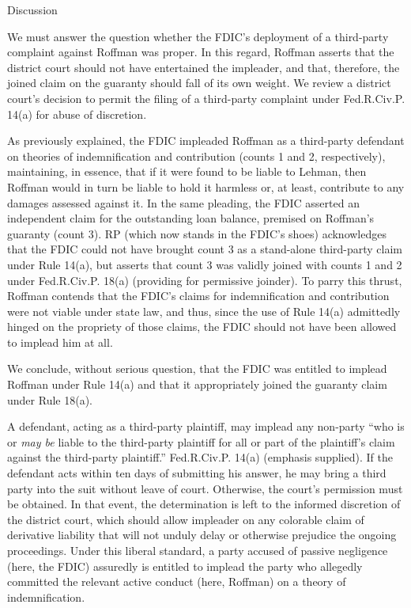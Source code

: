 \documentclass[11pt,letterpaper,twoside]{article}
\begin{document}
{Discussion}

We must answer the question whether the FDIC's deployment of a
third-party complaint against Roffman was proper. In this regard,
Roffman asserts that the district court should not have entertained the
impleader, and that, therefore, the joined claim on the guaranty should
fall of its own weight. We review a district court's decision to permit
the filing of a third-party complaint under Fed.R.Civ.P. 14(a) for abuse
of discretion.

As previously explained, the FDIC impleaded Roffman as a third-party
defendant on theories of indemnification and contribution (counts 1 and
2, respectively), maintaining, in essence, that if it were found to be
liable to Lehman, then Roffman would in turn be liable to hold it
harmless or, at least, contribute to any damages assessed against it. In
the same pleading, the FDIC asserted an independent claim for the
outstanding loan balance, premised on Roffman's guaranty (count 3). RP
(which now stands in the FDIC's shoes) acknowledges that the FDIC could
not have brought count 3 as a stand-alone third-party claim under Rule
14(a), but asserts that count 3 was validly joined with counts 1 and 2
under Fed.R.Civ.P. 18(a) (providing for permissive joinder). To parry
this thrust, Roffman contends that the FDIC's claims for indemnification
and contribution were not viable under state law, and thus, since the
use of Rule 14(a) admittedly hinged on the propriety of those claims,
the FDIC should not have been allowed to implead him at all.

We conclude, without serious question, that the FDIC was entitled to
implead Roffman under Rule 14(a) and that it appropriately joined the
guaranty claim under Rule 18(a).

A defendant, acting as a third-party plaintiff, may implead any
non-party ``who is or \emph{may be} liable to the third-party plaintiff
for all or part of the plaintiff's claim against the third-party
plaintiff.'' Fed.R.Civ.P. 14(a) (emphasis supplied). If the defendant
acts within ten days of submitting his answer, he may bring a third
party into the suit without leave of court. Otherwise, the court's
permission must be obtained. In that event, the determination is left to
the informed discretion of the district court, which should allow
impleader on any colorable claim of derivative liability that will not
unduly delay or otherwise prejudice the ongoing proceedings. Under this
liberal standard, a party accused of passive negligence (here, the FDIC)
assuredly is entitled to implead the party who allegedly committed the
relevant active conduct (here, Roffman) on a theory of indemnification.
\end{document}
